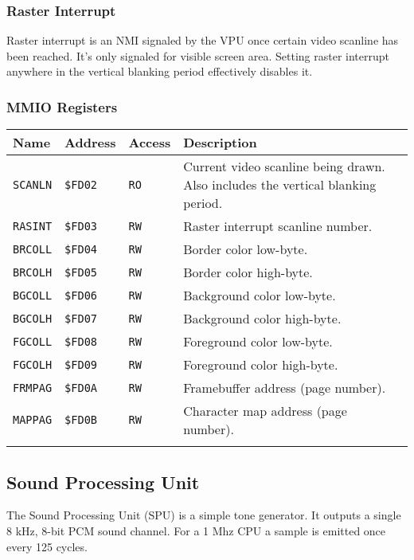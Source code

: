 \documentclass[a4paper,10pt,oneside]{article}
\begin{document}
\subsubsection*{Raster Interrupt}
Raster interrupt is an NMI signaled by the VPU once certain video scanline has been reached. It's only signaled for visible screen area. Setting raster interrupt anywhere in the vertical blanking period effectively disables it.

\subsubsection*{MMIO Registers}
\begin{tabularx}{\textwidth}{l | l | l | X }
  \textbf{Name} & \textbf{Address} & \textbf{Access} & \textbf{Description} \\ \hline
  \texttt{SCANLN} & \texttt{\$FD02} & \texttt{RO} &
  Current video scanline being drawn. Also includes the vertical blanking period. \\ \hline
  \texttt{RASINT} & \texttt{\$FD03} & \texttt{RW} &
  Raster interrupt scanline number. \\ \hline
  \texttt{BRCOLL} & \texttt{\$FD04} & \texttt{RW} &
  Border color low-byte. \\ \hline
  \texttt{BRCOLH} & \texttt{\$FD05} & \texttt{RW} &
  Border color high-byte. \\ \hline
  \texttt{BGCOLL} & \texttt{\$FD06} & \texttt{RW} &
  Background color low-byte. \\ \hline
  \texttt{BGCOLH} & \texttt{\$FD07} & \texttt{RW} &
  Background color high-byte. \\ \hline
  \texttt{FGCOLL} & \texttt{\$FD08} & \texttt{RW} &
  Foreground color low-byte. \\ \hline
  \texttt{FGCOLH} & \texttt{\$FD09} & \texttt{RW} &
  Foreground color high-byte. \\ \hline
  \texttt{FRMPAG} & \texttt{\$FD0A} & \texttt{RW} &
  Framebuffer address (page number). \\ \hline
  \texttt{MAPPAG} & \texttt{\$FD0B} & \texttt{RW} &
  Character map address (page number). \\
  \caption{VPU registers}
\end{tabularx}

\subsection{Sound Processing Unit}
The Sound Processing Unit (SPU) is a simple tone generator. It outputs a single 8 kHz, 8-bit PCM sound channel. For a 1 Mhz CPU a sample is emitted once every 125 cycles.
\end{document}
